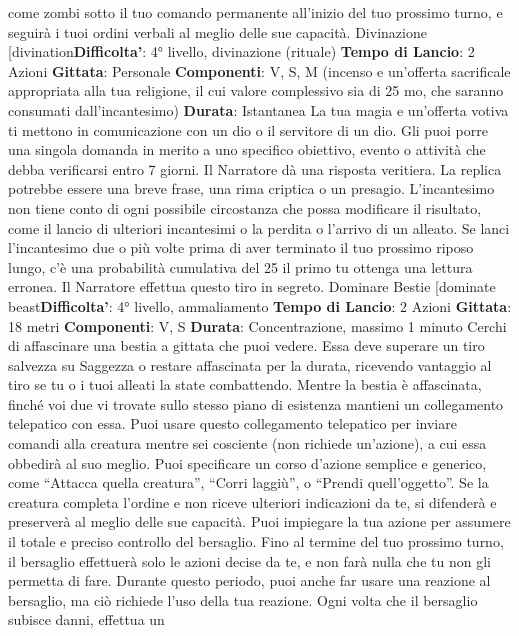 \begin{multicols}{2}
come zombi sotto il tuo comando permanente all’inizio
del tuo prossimo turno, e seguirà i tuoi ordini verbali al
meglio delle sue capacità.
Divinazione
[divination\textbf{Difficolta'}:
4° livello, divinazione (rituale)
\textbf{Tempo di Lancio}: 2 Azioni
\textbf{Gittata}: Personale
\textbf{Componenti}: V, S, M (incenso e un’offerta sacrificale
appropriata alla tua religione, il cui valore complessivo
sia di 25 mo, che saranno consumati dall’incantesimo)
\textbf{Durata}: Istantanea
La tua magia e un’offerta votiva ti mettono in
comunicazione con un dio o il servitore di un dio. Gli
puoi porre una singola domanda in merito a uno
specifico obiettivo, evento o attività che debba
verificarsi entro 7 giorni. Il Narratore dà una risposta veritiera.
La replica potrebbe essere una breve frase, una rima
criptica o un presagio.
L’incantesimo non tiene conto di ogni possibile
circostanza che possa modificare il risultato, come il
lancio di ulteriori incantesimi o la perdita o l’arrivo di un
alleato.
Se lanci l’incantesimo due o più volte prima di aver
terminato il tuo prossimo riposo lungo, c’è una
probabilità cumulativa del 25%
il primo tu ottenga una lettura erronea. Il Narratore effettua
questo tiro in segreto.
Dominare Bestie
[dominate beast\textbf{Difficolta'}:
4° livello, ammaliamento
\textbf{Tempo di Lancio}: 2 Azioni
\textbf{Gittata}: 18 metri
\textbf{Componenti}: V, S
\textbf{Durata}: Concentrazione, massimo 1 minuto
Cerchi di affascinare una bestia a gittata che puoi
vedere. Essa deve superare un tiro salvezza su
Saggezza o restare affascinata per la durata, ricevendo
vantaggio al tiro se tu o i tuoi alleati la state
combattendo.
Mentre la bestia è affascinata, finché voi due vi trovate
sullo stesso piano di esistenza mantieni un
collegamento telepatico con essa. Puoi usare questo
collegamento telepatico per inviare comandi alla
creatura mentre sei cosciente (non richiede un’azione),
a cui essa obbedirà al suo meglio. Puoi specificare un
corso d’azione semplice e generico, come “Attacca
quella creatura”, “Corri laggiù”, o “Prendi quell’oggetto”.
Se la creatura completa l’ordine e non riceve ulteriori
indicazioni da te, si difenderà e preserverà al meglio
delle sue capacità.
Puoi impiegare la tua azione per assumere il totale e
preciso controllo del bersaglio. Fino al termine del tuo
prossimo turno, il bersaglio effettuerà solo le azioni
decise da te, e non farà nulla che tu non gli permetta di
fare. Durante questo periodo, puoi anche far usare una
reazione al bersaglio, ma ciò richiede l’uso della tua
reazione.
Ogni volta che il bersaglio subisce danni, effettua un

\end{multicols}
